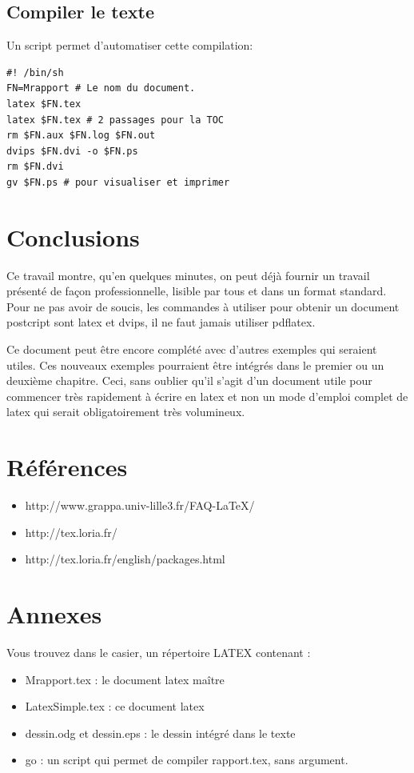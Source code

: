 \subsection {Compiler le texte}
Un script permet d'automatiser cette compilation:
\begin{lstlisting}
#! /bin/sh
FN=Mrapport # Le nom du document.
latex $FN.tex
latex $FN.tex # 2 passages pour la TOC
rm $FN.aux $FN.log $FN.out
dvips $FN.dvi -o $FN.ps
rm $FN.dvi
gv $FN.ps # pour visualiser et imprimer
\end{lstlisting}
\section{Conclusions}
Ce travail montre, qu'en quelques minutes, on peut déjà fournir un travail présenté de façon professionnelle, lisible par tous et dans un format standard.
Pour ne pas avoir de soucis, les commandes à utiliser pour obtenir un document postcript sont latex et dvips, il ne faut jamais utiliser pdflatex. 

Ce document peut être encore complété avec d'autres exemples qui seraient utiles. Ces nouveaux exemples pourraient être intégrés dans le premier ou un deuxième chapitre. Ceci, sans oublier qu'il s'agit d'un document utile pour commencer très rapidement à écrire en latex et non un mode d'emploi complet de latex qui serait obligatoirement très volumineux.
\section{Références}
\begin{itemize}
\item http://www.grappa.univ-lille3.fr/FAQ-LaTeX/ 
\item http://tex.loria.fr/
\item http://tex.loria.fr/english/packages.html
\end{itemize}
\section{Annexes }
Vous trouvez dans le casier, un répertoire LATEX contenant :
\begin{itemize}
\item Mrapport.tex : le document latex maître
\item LatexSimple.tex : ce document latex
\item dessin.odg et dessin.eps : le dessin intégré dans le texte
\item go : un script qui permet de compiler rapport.tex, sans argument.
\end{itemize}

